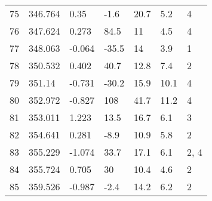 \begin{longtable}{|l|l|l|l|l|l|l|}
        75 & 346.764 & 0.35 & -1.6 & 20.7 & 5.2 & 4 \\ 
        76 & 347.624 & 0.273 & 84.5 & 11 & 4.5 & 4 \\ 
        77 & 348.063 & -0.064 & -35.5 & 14 & 3.9 & 1 \\ 
        78 & 350.532 & 0.402 & 40.7 & 12.8 & 7.4 & 2 \\ 
        79 & 351.14 & -0.731 & -30.2 & 15.9 & 10.1 & 4 \\ 
        80 & 352.972 & -0.827 & 108 & 41.7 & 11.2 & 4 \\ 
        81 & 353.011 & 1.223 & 13.5 & 16.7 & 6.1 & 3 \\ 
        82 & 354.641 & 0.281 & -8.9 & 10.9 & 5.8 & 2 \\ 
        83 & 355.229 & -1.074 & 33.7 & 17.1 & 6.1 & 2, 4 \\ 
        84 & 355.724 & 0.705 & 30 & 10.4 & 4.6 & 2 \\ 
        85 & 359.526 & -0.987 & -2.4 & 14.2 & 6.2 & 2 \\ \hline 

\end{longtable}